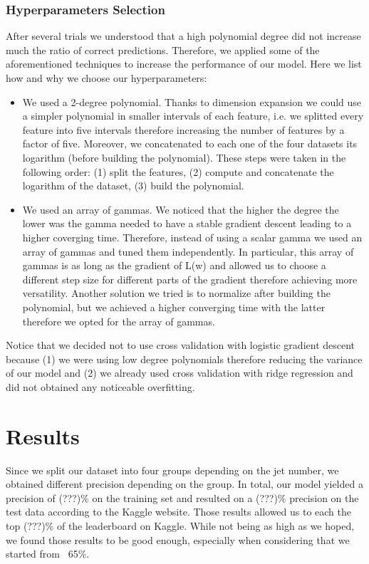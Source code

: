 \documentclass[10pt,conference,compsocconf]{IEEEtran}
\begin{document}
\subsubsection{Hyperparameters Selection}
After several trials we understood that a high polynomial degree did not increase much the ratio of correct predictions. Therefore, we applied some of the aforementioned techniques to increase the performance of our model. Here we list how and why we choose our hyperparameters:
\begin{itemize}
\item We used a 2-degree polynomial. Thanks to dimension expansion we could use a simpler polynomial in smaller intervals of each feature, i.e. we splitted every feature into five intervals therefore increasing the number of features by a factor of five. Moreover, we concatenated to each one of the four datasets its logarithm (before building the polynomial). These steps were taken in the following order: (1) split the features, (2) compute and concatenate the logarithm of the dataset, (3) build the polynomial.  

\item We used an array of gammas. We noticed that the higher the degree the lower was the gamma needed to have a stable gradient descent leading to a higher coverging time. Therefore, instead of using a scalar gamma we used an array of gammas and tuned them independently. In particular, this array of gammas is as long as the gradient of L(w) and allowed us to choose a different step size for different parts of the gradient therefore achieving more versatility. Another solution we tried is to normalize after building the polynomial, but we achieved a higher converging time with the latter therefore we opted for the array of gammas.
\end{itemize}
Notice that we decided not to use cross validation with logistic gradient descent because (1) we were using low degree polynomials therefore reducing the variance of our model and (2) we already used cross validation with ridge regression and did not obtained any noticeable overfitting.


\section{Results}
 Since we split our dataset into four groups depending on the jet number, we obtained different precision depending on the group. In total, our model yielded a precision of (???)\% on the training set and resulted on a (???)\% precision on the test data according to the Kaggle website. Those results allowed us to each the top (???)\% of the leaderboard on Kaggle. While not being as high as we hoped, we found those results to be good enough, especially when considering that we started from ~65\%.
\end{document}
